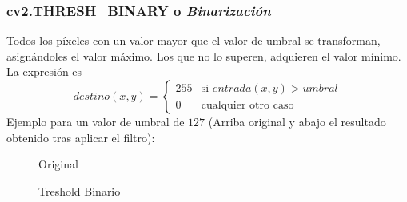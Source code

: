 \subsubsection{cv2.THRESH\_BINARY o
  \emph{Binarización}}\label{tecnica:threshold-binario}
Todos los píxeles con un valor mayor que el valor de umbral se
transforman, asignándoles el valor máximo. Los que no lo superen,
adquieren el valor mínimo.  La expresión es
\begin{equation*}
  destino(x, y) =
  \begin{cases}
    255 & \text{si } entrada(x, y) > umbral \\
    0 & \text{cualquier otro caso}
  \end{cases}
\end{equation*}
Ejemplo para un valor de umbral de $127$ (Arriba original y abajo el
resultado obtenido tras aplicar el filtro):

\begin{figure}[H]
  \caption{Original}
  \centering \setlength\fboxsep{0pt} \setlength\fboxrule{0.5pt}
\end{figure}

\begin{figure}[H]
  \centering \setlength\fboxsep{0pt} \setlength\fboxrule{0.5pt}
  \caption{Treshold Binario}
\end{figure}

